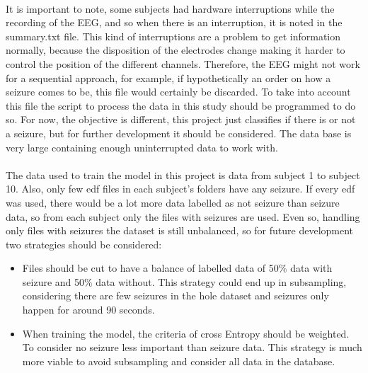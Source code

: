 \\
It is important to note, some subjects had hardware interruptions while the recording of the EEG, and so when there is an interruption, it is noted in the summary.txt file. This kind of interruptions are a problem to get information normally, because the disposition of the electrodes change making it harder to control the position of the different channels. Therefore, the EEG might not work for a sequential approach, for example, if hypothetically an order on how a seizure comes to be, this file would certainly be discarded. To take into account this file the script to process the data in this study should be programmed to do so. For now, the objective is different, this project just classifies if there is or not a seizure, but for further development it should be considered. The data base is very large containing enough uninterrupted data to work with.
\\\\
The data used to train the model in this project is data from subject 1 to subject 10. Also, only few edf files in each subject’s folders have any seizure. If every edf was used, there would be a lot more data labelled as not seizure than seizure data, so from each subject only the files with seizures are used. Even so, handling only files with seizures the dataset is still unbalanced, so for future development two strategies should be considered:
\\
\begin{itemize}
  \item Files should be cut to have a balance of labelled data of 50\% data with seizure and 50\% data without. This strategy could end up in subsampling, considering there are few seizures in the hole dataset and seizures only happen for around 90 seconds.
  \item When training the model, the criteria of cross Entropy should be weighted. To consider no seizure less important than seizure data. This strategy is much more viable to avoid subsampling and consider all data in the database.
\end{itemize}
\leavevmode\\
